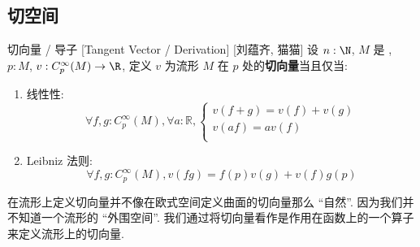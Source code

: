 \documentclass[UTF8]{ctexart}
\begin{document}
    \subsection{切空间}

            



        \begin{dfn}
            {切向量 / 导子}
            [Tangent Vector / Derivation]
            [刘蕴齐, 猫猫]
            设 \(n:\N\), \(M\) 是 , \(p:M\), \(v:C_p^{\infty}(M)\to\R\), 定义 \(v\) 为流形 \(M\) 在 \(p\) 处的\textbf{切向量}当且仅当: 
            \begin{enumerate}
                \item 线性性: 
                \[
                \forall f,g:C_p^{\infty} (M), \forall a:\mathbb{R}, 
                \begin{cases}
                    v (f + g) =v( f ) + v( g )\\
                    v(a f) = av( f )\\
                \end{cases}
                \]
                \item Leibniz 法则: 
                \[\forall f,g:C_p^{\infty} (M), v(fg) = f(p)v(g)+v(f)g(p)\]
            \end{enumerate}
        \end{dfn}

        \begin{rmk}
            [刘蕴齐]
            在流形上定义切向量并不像在欧式空间定义曲面的切向量那么 ``自然''. 因为我们并不知道一个流形的 ``外围空间''. 我们通过将切向量看作是作用在函数上的一个算子来定义流形上的切向量. 
        \end{rmk}
\end{document}
